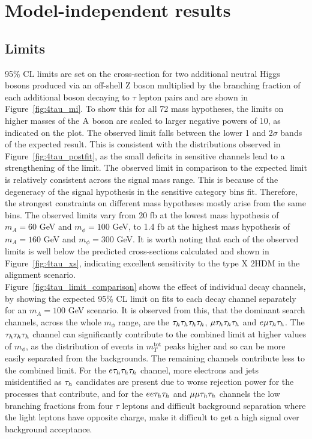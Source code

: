 \section{Model-independent results}

\subsection{Limits}

95\% \ac{CL} limits are set on the cross-section for two additional neutral Higgs bosons produced via an off-shell Z boson multiplied by the branching fraction of each additional boson decaying to $\tau$ lepton pairs and are shown in Figure~\ref{fig:4tau_mi}.
To show this for all 72 mass hypotheses, the limits on higher masses of the ${\text{A}}$ boson are scaled to larger negative powers of 10, as indicated on the plot.
The observed limit falls between the lower 1 and 2$\sigma$ bands of the expected result.
This is consistent with the distributions observed in Figure~\ref{fig:4tau_postfit}, as the small deficits in sensitive channels lead to a strengthening of the limit.
The observed limit in comparison to the expected limit is relatively consistent across the signal mass range.
This is because of the degeneracy of the signal hypothesis in the sensitive category bins fit.
Therefore, the strongest constraints on different mass hypotheses mostly arise from the same bins.
The observed limits vary from 20 fb at the lowest mass hypothesis of $m_A = 60$ GeV and $m_{\phi} = 100$ GeV, to 1.4 fb at the highest mass hypothesis of $m_A = 160$ GeV and $m_{\phi} = 300$ GeV.
It is worth noting that each of the observed limits is well below the predicted cross-sections calculated and shown in Figure~\ref{fig:4tau_xs}, indicating excellent sensitivity to the type X \ac{2HDM} in the alignment scenario. \\

Figure~\ref{fig:4tau_limit_comparison} shows the effect of individual decay channels, by showing the expected 95\% \ac{CL} limit on fits to each decay channel separately for an $m_{A} = 100$ GeV scenario.
It is observed from this, that the dominant search channels, across the whole $m_{\phi}$ range, are the $\tau_{h}\tau_{h}\tau_{h}\tau_{h}$, $\mu\tau_{h}\tau_{h}\tau_{h}$ and $e\mu\tau_{h}\tau_{h}$.
The $\tau_{h}\tau_{h}\tau_{h}$ channel can significantly contribute to the combined limit at higher values of $m_{\phi}$, as the distribution of events in $m_{T}^{\text{tot}}$ peaks higher and so can be more easily separated from the \jtth backgrounds.
The remaining channels contribute less to the combined limit.
For the $e\tau_{h}\tau_{h}\tau_{h}$ channel, more electrons and jets misidentified as $\tau_{h}$ candidates are present due to worse rejection power for the processes that contribute, and for the $ee\tau_{h}\tau_{h}$ and $\mu\mu\tau_{h}\tau_{h}$ channels the low branching fractions from four $\tau$ leptons and difficult background separation where the light leptons have opposite charge, make it difficult to get a high signal over background acceptance.


